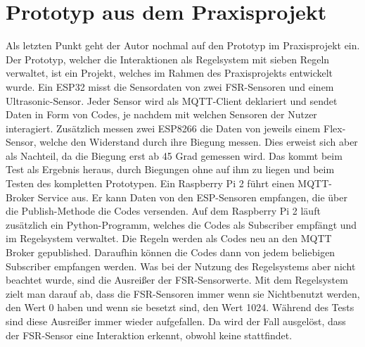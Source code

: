\section{Prototyp aus dem Praxisprojekt}
Als letzten Punkt geht der Autor nochmal auf den Prototyp im Praxisprojekt ein. Der Prototyp, welcher die Interaktionen als Regelsystem mit sieben Regeln verwaltet, ist ein Projekt, welches im Rahmen des Praxisprojekts entwickelt wurde. Ein ESP32 misst die Sensordaten von zwei FSR-Sensoren und einem Ultrasonic-Sensor. Jeder Sensor wird als MQTT-Client deklariert und sendet Daten in Form von Codes, je nachdem mit welchen Sensoren der Nutzer interagiert. Zusätzlich messen zwei ESP8266 die Daten von jeweils einem Flex-Sensor, welche den Widerstand durch ihre Biegung messen. \citep{saggio2015resistive} Dies erweist sich aber als Nachteil, da die Biegung erst ab 45 Grad gemessen wird. Das kommt beim Test als Ergebnis heraus, durch Biegungen ohne auf ihm zu liegen und beim Testen des kompletten Prototypen. 
\newline
Ein Raspberry Pi 2 führt einen MQTT-Broker Service aus. Er kann Daten von den ESP-Sensoren empfangen, die über die Publish-Methode die Codes versenden. Auf dem Raspberry Pi 2 läuft zusätzlich ein Python-Programm, welches die Codes als Subscriber empfängt und im Regelsystem verwaltet. Die Regeln werden als Codes neu an den MQTT Broker gepublished. Daraufhin können die Codes dann von jedem beliebigen Subscriber empfangen werden. \citep{Schroeder2019} 
\newline
Was bei der Nutzung des Regelsystems aber nicht beachtet wurde, sind die Ausreißer der FSR-Sensorwerte. Mit dem Regelsystem zielt man darauf ab, dass die FSR-Sensoren immer wenn sie Nichtbenutzt werden, den Wert 0 haben und wenn sie besetzt sind, den Wert 1024. Während des Tests sind diese Ausreißer immer wieder aufgefallen. Da wird der Fall ausgelöst, dass der FSR-Sensor eine Interaktion erkennt, obwohl keine stattfindet.
